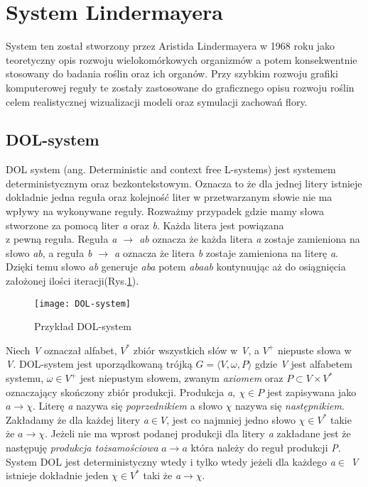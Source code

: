 \documentclass[12pt]{report}
\renewcommand{\figurename}{Rys.}
\begin{document}
\begin{sloppypar}
\section{System Lindermayera}

System ten został stworzony przez Aristida Lindermayera w 1968 roku jako teoretyczny opis rozwoju wielokomórkowych organizmów a potem konsekwentnie stosowany do badania roślin oraz ich organów. Przy szybkim rozwoju grafiki komputerowej reguły te zostały zastosowane do graficznego opisu rozwoju roślin celem realistycznej wizualizacji modeli oraz symulacji zachowań flory. 




\subsection{DOL-system}
DOL system (ang. Deterministic and context free L-systems) jest systemem deterministycznym oraz bezkontekstowym. Oznacza to że dla jednej litery istnieje dokładnie jedna reguła oraz kolejność liter w przetwarzanym słowie nie ma wpływy na wykonywane reguły.
Rozważmy przypadek gdzie mamy słowa stworzone za pomocą liter \textit{a} oraz \textit{b}. Każda litera jest powiązana\\z pewną reguła. Reguła \textit{a $\rightarrow $ ab} oznacza że każda litera \textit{a} zostaje zamieniona na słowo \textit{ab}, a reguła \textit{b $\rightarrow $ a} oznacza że litera \textit{b} zostaje zamieniona na literę \textit{a}. Dzięki temu słowo \textit{ab} generuje \textit{aba} potem \textit{abaab} kontynuując aż do osiągnięcia założonej ilości iteracji(\figurename \ref{fig:DOL-System}).
\begin{figure}[!htb]
\centering
\texttt{[image: DOL-system]} 
\caption{Przykład DOL-system \label{fig:DOL-System}}
\end{figure}
\newpage
Niech \textit{V}  oznaczał alfabet, \textit{$V^{*}$} zbiór wszystkich słów w \textit{V}, a \textit{$V^{+}$} niepuste słowa w \textit{V}. DOL-system jest uporządkowaną trójką $G= \langle V,\omega,P\rangle$ gdzie \textit{V} jest alfabetem systemu, $\omega\in V^{+}$ jest niepustym słowem, zwanym \textit{axiomem} oraz $P\subset V \times V^{*}$ oznaczający skończony zbiór produkcji. Produkcja \textit{a, $\chi\in P $} jest zapisywana jako $a \rightarrow \chi$. Literę \textit{a} nazywa się \textit{poprzednikiem} a słowo \textit{$\chi$} nazywa się \textit{następnikiem}. Zakładamy że dla każdej litery \textit{a$\in V$}, jest co najmniej jedno słowo \textit{$\chi\in V^{*}$} takie że $a \rightarrow \chi$. Jeżeli nie ma wprost podanej produkcji dla litery \textit{a} zakładane jest że następuję \textit{produkcja tożsamościowa} \textit{$a \rightarrow a$} która należy do reguł produkcji \textit{P}. System DOL jest deterministyczny wtedy i tylko wtedy jeżeli dla każdego \textit{a$\in$ V} istnieje dokładnie jeden \textit{$\chi \in V^{*}$} taki że \textit{a$\rightarrow\chi$}.


\end{sloppypar}
\end{document}
